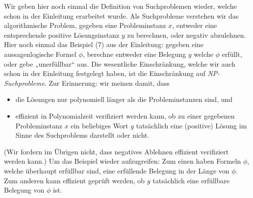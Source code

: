 Wir geben hier noch einmal die Definition von Suchproblemen wieder, welche schon in der Einleitung erarbeitet wurde.
Als Suchprobleme verstehen wir das algorithmische Problem, gegeben eine Probleminstanz $x$, entweder eine entsprechende positive Lösungsinstanz $y$ zu berechnen, oder negativ abzulehnen.  Hier noch einmal das Beispiel (7) aus der Einleitung: gegeben eine aussagenlogische Formel $\phi$, berechne entweder eine Belegung $y$ welche $\phi$ erfüllt, oder gebe „unerfüllbar“ aus.
Die wesentliche Einschränkung, welche wir auch schon in der Einleitung festgelegt haben, ist die Einschränkung auf \emph{NP-Suchprobleme}. Zur Erinnerung: wir meinen damit, dass
\begin{itemize}
    \item die Lösungen nur polynomiell länger als die Probleminstanzen sind, und
    \item effizient in Polynomialzeit verifiziert werden kann, ob zu einer gegebenen Probleminstanz $x$ ein beliebiges Wort $y$ tatsächlich eine (positive) Lösung im Sinne des Suchproblems darstellt oder nicht.
\end{itemize}
(Wir fordern im Übrigen nicht, dass negatives Ablehnen effizient verifiziert werden kann.)
Um das Beispiel wieder aufzugreifen: Zum einen haben Formeln $\phi$, welche überhaupt erfüllbar sind, eine erfüllende Belegung in der Länge von $\phi$. Zum anderen kann effizient geprüft werden, ob $y$ tatsächlich eine erfüllbare Belegung von $\phi$ ist.

